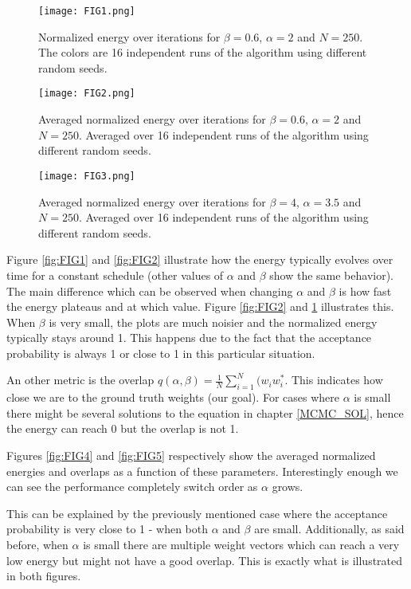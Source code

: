 \documentclass[a4paper]{article}
\begin{document}
\begin{figure}[!htb]
 \centering
{}
\centering
\texttt{[image: FIG1.png]}
\caption{\label{fig:FIG1}Normalized energy over iterations for $\beta = 0.6$, $\alpha = 2$ and $N = 250$. The colors are 16 independent runs of the algorithm using different random seeds.}
\endminipage\par\medskip
{}
\texttt{[image: FIG2.png]}
\caption{\label{fig:FIG2}Averaged normalized energy over iterations for $\beta = 0.6$, $\alpha = 2$ and $N = 250$. Averaged over 16 independent runs of the algorithm using different random seeds.}
\endminipage\hfill
{}%
\texttt{[image: FIG3.png]}
\caption{\label{fig:FIG3}Averaged normalized energy over iterations for $\beta = 4$, $\alpha = 3.5$ and $N = 250$. Averaged over 16 independent runs of the algorithm using different random seeds.}
\endminipage
\end{figure}


Figure \ref{fig:FIG1} and \ref{fig:FIG2} illustrate how the energy typically evolves over time for a constant schedule (other values of $\alpha$ and $\beta$ show the same behavior). The main difference which can be observed when changing $\alpha$ and $\beta$ is how fast the energy plateaus and at which value. Figure \ref{fig:FIG2} and \ref{fig:FIG3} illustrates this. When $\beta$ is very small, the plots are much noisier and the normalized energy typically stays around 1. This happens due to the fact that the acceptance probability is always 1 or close to 1 in this particular situation.

An other metric is the overlap $q(\alpha, \beta) = \frac{1}{N} \sum_{i = 1}^{N}(w_i w_{i}^{*}$. This indicates how close we are to the ground truth weights (our goal). For cases where $\alpha$ is small there might be several solutions to the equation in chapter \ref{MCMC_SOL}, hence the energy can reach 0 but the overlap is not 1.

Figures \ref{fig:FIG4} and \ref{fig:FIG5} respectively show the averaged normalized energies and overlaps as a function of these parameters. Interestingly enough we can see the performance completely switch order as $\alpha$ grows.

This can be explained by the previously mentioned case where the acceptance probability is very close to 1 - when both $\alpha$ and $\beta$ are small. Additionally, as said before, when $\alpha$ is small there are multiple weight vectors which can reach a very low energy but might not have a good overlap. This is exactly what is illustrated in both figures.
\end{document}
